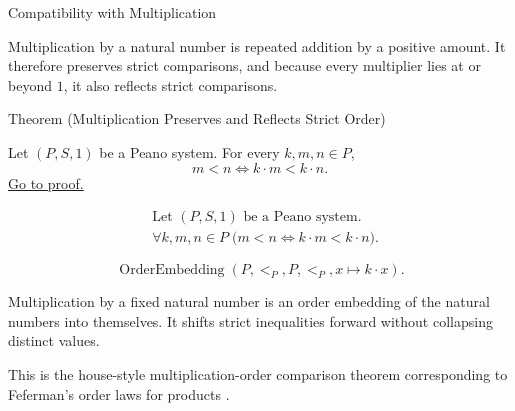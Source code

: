 \begin{topicbox}{Compatibility with Multiplication}
\begin{exposition}
Multiplication by a natural number is repeated addition by a positive amount.
It therefore preserves strict comparisons, and because every multiplier lies
at or beyond $1$, it also reflects strict comparisons.
\end{exposition}

\begin{theorembox}{Theorem (Multiplication Preserves and Reflects Strict Order)}
\begin{theorem}
\label{thm:multiplication-preserves-and-reflects-strict-order}
Let $(P,S,1)$ be a Peano system. For every $k,m,n \in P$,
\[
m<n
\Longleftrightarrow
k\cdot m<k\cdot n.
\]
\hyperref[prf:multiplication-preserves-and-reflects-strict-order]{Go to proof.}
\end{theorem}
\end{theorembox}

\begin{remark*}
\[
\begin{aligned}
&\text{Let } (P,S,1) \text{ be a Peano system.}\\
&\forall k,m,n \in P\;\bigl(m<n \Longleftrightarrow k\cdot m<k\cdot n\bigr).
\end{aligned}
\]
\end{remark*}

\begin{remark*}
\[
\operatorname{OrderEmbedding}(P,<_{P},P,<_{P},x \mapsto k\cdot x).
\]
\end{remark*}

\begin{remark*}[Interpretation]
Multiplication by a fixed natural number is an order embedding of the natural
numbers into themselves. It shifts strict inequalities forward without
collapsing distinct values.


This is the house-style multiplication-order comparison theorem corresponding
to Feferman's order laws for products \citep{FefermanNumberSystems1964}.
\end{remark*}


\end{topicbox}
